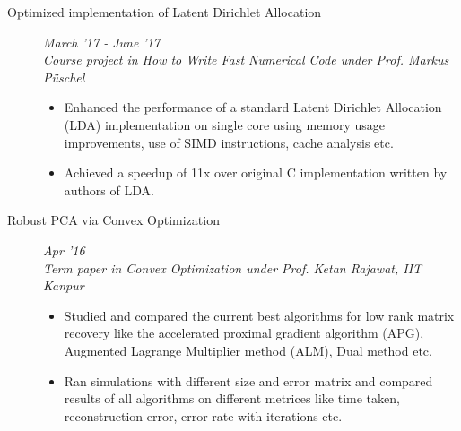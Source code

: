 \documentclass[9pt]{article}
\newenvironment{changemargin}[2]{%
  \begin{list}{}{%
      \setlength{\topsep}{0pt}%
    \setlength{\leftmargin}{#1}%
    \setlength{\rightmargin}{#2}%
    \setlength{\listparindent}{\parindent}%
  \setlength{\itemindent}{\parindent}%
    \setlength{\parsep}{\parskip}%
    }%
  \item[]}{\end{list}
    }
\newenvironment{body} {
  \vspace*{-16pt}
        \begin{changemargin}{-0.6in}{-0.65in}
        }	
        {\end{changemargin}
}
\begin{document}
\begin{body}
\begin{description}
    \item[\normalsize{Optimized implementation of Latent Dirichlet Allocation}]  \hfill \textit{March '17 - June '17} \\
      \textit{Course project in How to Write Fast Numerical Code under Prof. Markus P{\"u}schel}
      \begin{itemize}
        \item Enhanced the performance of a standard Latent Dirichlet Allocation (LDA)
          implementation on single core using memory usage improvements, use of 
          SIMD instructions, cache analysis etc.
        \item Achieved a speedup of 11x over original C implementation written by authors
          of LDA.
      \end{itemize}

    \item[\normalsize{Robust PCA via Convex Optimization}] \hfill \textit{Apr '16} \\
      \textit{Term paper in Convex Optimization under Prof. Ketan Rajawat, IIT Kanpur}
      \begin{itemize}
      \item Studied and compared the current best algorithms for low rank matrix recovery like the 
        accelerated proximal
        gradient algorithm (APG), Augmented Lagrange Multiplier method (ALM), Dual method etc.
      \item Ran simulations with different size and error matrix and compared results of all algorithms 
        on different metrices 
          like time taken, reconstruction error, error-rate with iterations etc.
      \end{itemize}



\end{description}
\end{body}
\end{document}
